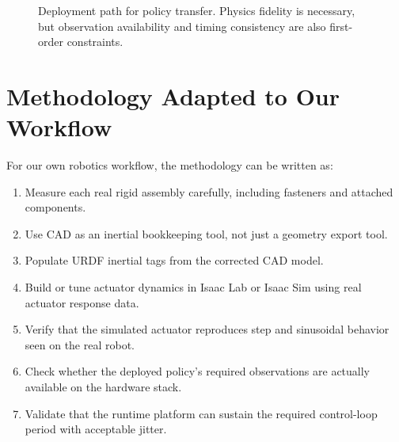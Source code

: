 \documentclass[11pt,a4paper]{article}
\begin{document}
\begin{figure}[H]
\centering
{}
\caption{Deployment path for policy transfer.  Physics fidelity is necessary, but observation availability and timing consistency are also first-order constraints.}
\label{fig:deployment_path}
\end{figure}

\section{Methodology Adapted to Our Workflow}

For our own robotics workflow, the methodology can be written as:
\begin{enumerate}[leftmargin=2em]
  \item Measure each real rigid assembly carefully, including fasteners and attached components.
  \item Use CAD as an inertial bookkeeping tool, not just a geometry export tool.
  \item Populate URDF inertial tags from the corrected CAD model.
  \item Build or tune actuator dynamics in Isaac Lab or Isaac Sim using real actuator response data.
  \item Verify that the simulated actuator reproduces step and sinusoidal behavior seen on the real robot.
  \item Check whether the deployed policy's required observations are actually available on the hardware stack.
  \item Validate that the runtime platform can sustain the required control-loop period with acceptable jitter.
\end{enumerate}
\end{document}
